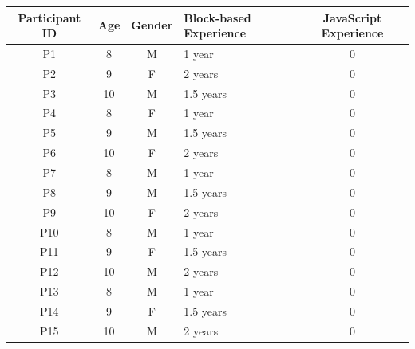 \begin{table}
\centering

\begin{tabular}{@{}c c c m{3.5cm} c@{}}
\toprule
\textbf{Participant ID} & \textbf{Age} & \textbf{Gender} & \textbf{Block-based Experience} & \textbf{JavaScript Experience} \\
\midrule
P1 & 8 & M & 1 year & 0 \\
P2 & 9 & F & 2 years & 0 \\
P3 & 10 & M & 1.5 years & 0 \\
P4 & 8 & F & 1 year & 0 \\
P5 & 9 & M & 1.5 years & 0 \\
P6 & 10 & F & 2 years & 0 \\
P7 & 8 & M & 1 year & 0 \\
P8 & 9 & M & 1.5 years & 0 \\
P9 & 10 & F & 2 years & 0 \\
P10 & 8 & M & 1 year & 0 \\
P11 & 9 & F & 1.5 years & 0 \\
P12 & 10 & M & 2 years & 0 \\
P13 & 8 & M & 1 year & 0 \\
P14 & 9 & F & 1.5 years & 0 \\
P15 & 10 & M & 2 years & 0 \\
\bottomrule
\end{tabular}

\end{table}